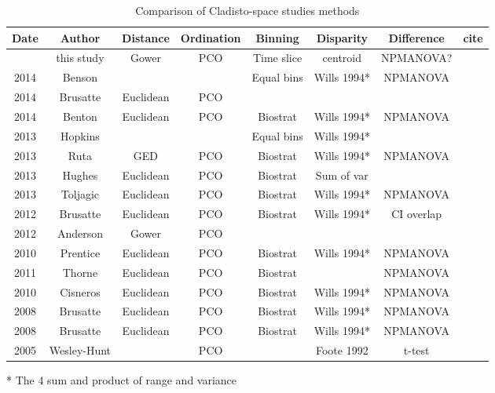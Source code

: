 \documentclass[12pt,letterpaper]{article}
\begin{document}
\begin{table}[ht]
\caption{Comparison of Cladisto-space studies methods}
\centering
\begin{tabular}{cccccccc}
  \hline
    Date & Author      & Distance  & Ordination & Binning    & Disparity   & Difference & cite \\ %
  \hline
         & this study  & Gower     & PCO        & Time slice & centroid    & NPMANOVA?  & \\
    2014 & Benson      &           &            & Equal bins & Wills 1994* & NPMANOVA   & \cite{bensonfaunal2014} \\
    2014 & Brusatte    & Euclidean & PCO        &            &             &            & \cite{brusattegradual2014} \\
    2014 & Benton      & Euclidean & PCO        & Biostrat   & Wills 1994* & NPMANOVA   & \cite{bentonmodels2014} \\
    2013 & Hopkins     &           &            & Equal bins & Wills 1994* &            & \cite{hopkinsdecoupling2013} \\             
    2013 & Ruta        & GED       & PCO        & Biostrat   & Wills 1994* & NPMANOVA   & \cite{ruta2013} \\
    2013 & Hughes      & Euclidean & PCO        & Biostrat   & Sum of var  &            & \cite{Hughes20082013} \\
    2013 & Toljagic    & Euclidean & PCO        & Biostrat   & Wills 1994* & NPMANOVA   & \cite{toljagictriassic-jurassic2013} \\
    2012 & Brusatte    & Euclidean & PCO        & Biostrat   & Wills 1994* & CI overlap & \cite{brusattedinosaur2012} \\
    2012 & Anderson    & Gower     & PCO        &            &             &            & \cite{anderson2012using} \\
    2010 & Prentice    & Euclidean & PCO        & Biostrat   & Wills 1994* & NPMANOVA   & \cite{prentice2011} \\
    2011 & Thorne      & Euclidean & PCO        & Biostrat   &             & NPMANOVA   & \cite{thorneresetting2011} \\
    2010 & Cisneros    & Euclidean & PCO        & Biostrat   & Wills 1994* & NPMANOVA   & \cite{cisneros2010} \\
    2008 & Brusatte    & Euclidean & PCO        & Biostrat   & Wills 1994* & NPMANOVA   & \cite{brusatte50} \\
    2008 & Brusatte    & Euclidean & PCO        & Biostrat   & Wills 1994* & NPMANOVA   & \cite{Brusatte12092008} \\
    2005 & Wesley-Hunt &           & PCO        &            & Foote 1992  & t-test     & \cite{Wesley-Hunt2005} \\
  \hline
\end{tabular}
\end{table}
* The 4 sum and product of range and variance




\end{document}
